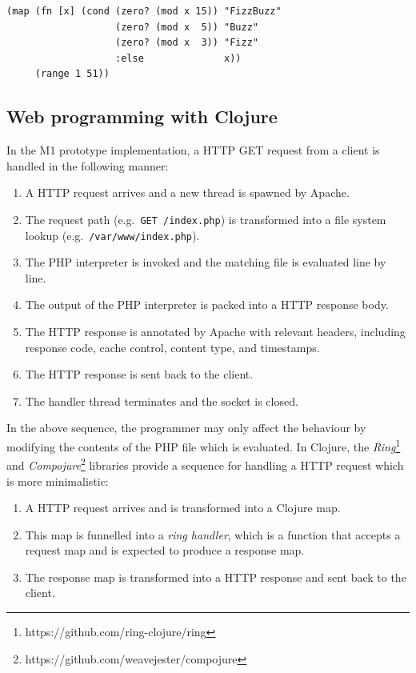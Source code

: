 \lstset{language=clojure}
\begin{lstlisting}[label=lst:fizzbuzz-functional,caption={
      [A functional implementation of Fizz buzz in Clojure]
       A functional implementation of Fizz buzz in Clojure.}]
(map (fn [x] (cond (zero? (mod x 15)) "FizzBuzz"
                   (zero? (mod x  5)) "Buzz"
                   (zero? (mod x  3)) "Fizz"
                   :else              x))
     (range 1 51))
\end{lstlisting}

\subsection{Web programming with Clojure}\label{subsec:functional-web}

In the M1 prototype implementation, a HTTP GET request from a client
is handled in the following manner:

\begin{enumerate}
\item A HTTP request arrives and a new thread is spawned by Apache.
\item The request path (e.g.\ \texttt{GET /index.php}) is transformed into
  a file system lookup (e.g.\ \texttt{/var/www/index.php}).
\item The PHP interpreter is invoked and the matching file is
  evaluated line by line.
\item The output of the PHP interpreter is packed into a HTTP response
  body.
\item The HTTP response is annotated by Apache with relevant headers,
  including response code, cache control, content type, and
  timestamps.
\item The HTTP response is sent back to the client.
\item The handler thread terminates and the socket is closed.
\end{enumerate}

In the above sequence, the programmer may only affect the behaviour by
modifying the contents of the PHP file which is evaluated. In Clojure,
the \textit{Ring}\footnote{https://github.com/ring-clojure/ring} and
\textit{Compojure}\footnote{https://github.com/weavejester/compojure}
libraries provide a sequence for handling a HTTP request which is more
minimalistic:

\begin{enumerate}
\item A HTTP request arrives and is transformed into a Clojure map.
\item This map is funnelled into a \textit{ring handler}, which is a
  function that accepts a request map and is expected to produce a
  response map.
\item The response map is transformed into a HTTP response and sent
  back to the client.
\end{enumerate}

